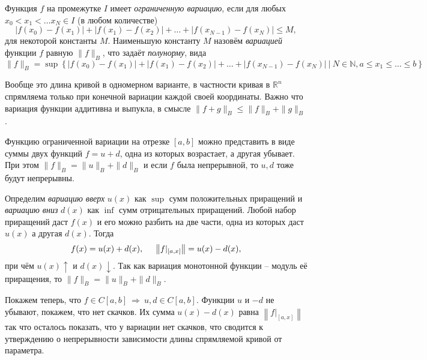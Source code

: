 
\begin{to_def}
    Функция $f$ на промежутке $I$ имеет \textit{ограниченную вариацию}, если для любых $x_0 < x_1 < \ldots  x_N \in I$ (в любом количестве)
    \begin{equation*}
        |f(x_0) - f(x_1)| + 
        |f(x_1) - f(x_2)| + \ldots +
        |f(x_{N-1}) - f(x_N)| \leq M,
    \end{equation*}
    для некоторой константы $M$. Наименьшую константу $M$  назовём \textit{вариацией} функции $f$ равную $\|f\|_B$, что задаёт \textit{полунорму}, вида
    \begin{equation*}
        \|f\|_B = \sup\left\{
                            |f(x_0) - f(x_1)| + 
                        |f(x_1) - f(x_2)| + \ldots +
                        |f(x_{N-1}) - f(x_N)| \ 
                        \bigg| \ 
                        N \in \mathbb{N}, a \leq x_1 \leq \ldots \leq b\right\}
    \end{equation*}
\end{to_def}

Вообще это длина кривой в одномерном варианте, в частности кривая в $\mathbb{R}^n$ спрямляема только при конечной вариации каждой своей координаты. Важно что вариация функции аддитивна и выпукла, в смысле $\|f + g\|_B \leq \|f\|_B + \|g\|_B$.

\begin{to_lem}
    Функцию ограниченной вариации на отрезке $[a, b]$ можно представить в виде суммы двух функций $f = u + d$, одна из которых возрастает, а другая убывает. При этом $\|f\|_B = \|u\|_B + \|d\|_B$ и если $f$ была непрерывной, то $u, d$ тоже будут непрерывны.
\end{to_lem}


\begin{uproof}
    Определим \textit{вариацию вверх} $u(x)$ как $\sup$ сумм положительных приращений и \textit{вариацию вниз} $d(x)$ как $\inf$ сумм отрицательных приращений. Любой набор приращений даст $f(x)$ и его можно разбить на две части, одна из которых даст $u(x)$ а другая $d(x)$. Тогда
    \begin{equation*}
        f(x) = u(x) + d(x), \hspace{5 mm} 
        \left\| f|_{[a, x]} \right\| = u(x) - d(x),
    \end{equation*}
    при чём $u(x) \uparrow$ и $d(x) \downarrow$. Так как вариация монотонной функции -- модуль её приращения, то $\|f\|_B = \|u\|_B + \|d\|_B$. 

    Покажем теперь, что $f \in C[a, b] \ \Rightarrow \ u, d \in C[a,b]$. Функции $u$ и $-d$ не убывают, покажем, что нет скачков. Их сумма $u(x) - d(x)$ равна $\left\| f|_{[a, x]} \right\|$ так что осталось показать, что у вариации нет скачков, что сводится к утверждению о непрерывности зависимости длины спрямляемой кривой от параметра. 
\end{uproof}


